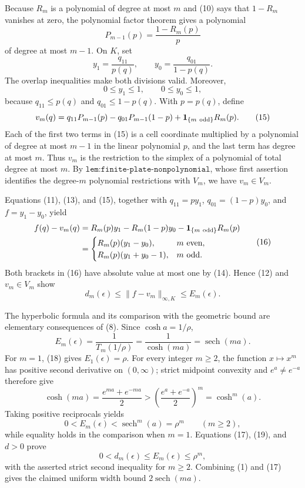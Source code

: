 Because \(R_m\) is a polynomial of degree at most \(m\) and (10) says that \(1-R_m\) vanishes at zero, the polynomial factor theorem gives a polynomial
\[
 P_{m-1}(p)=\frac{1-R_m(p)}{p} \tag{13}
\]
of degree at most \(m-1\).  On \(K\), set
\[
 y_1=\frac{q_{11}}{p(q)},
 \qquad
 y_0=\frac{q_{01}}{1-p(q)}.
\]
The overlap inequalities make both divisions valid.  Moreover,
\[
 0\leq y_1\leq1,
 \qquad
 0\leq y_0\leq1, \tag{14}
\]
because \(q_{11}\leq p(q)\) and \(q_{01}\leq1-p(q)\).  With \(p=p(q)\), define
\[
 v_m(q)=q_{11}P_{m-1}(p)-q_{01}P_{m-1}(1-p)
 +\mathbf 1_{\{m\ {\rm odd}\}}R_m(p). \tag{15}
\]
Each of the first two terms in (15) is a cell coordinate multiplied by a polynomial of degree at most \(m-1\) in the linear polynomial \(p\), and the last term has degree at most \(m\).  Thus \(v_m\) is the restriction to the simplex of a polynomial of total degree at most \(m\).  By \(\texttt{lem:finite-plate-nonpolynomial}\), whose first assertion identifies the degree-\(m\) polynomial restrictions with \(V_m\), we have \(v_m\in V_m\).

Equations (11), (13), and (15), together with \(q_{11}=py_1\), \(q_{01}=(1-p)y_0\), and \(f=y_1-y_0\), yield
\[
\begin{aligned}
 f(q)-v_m(q)
 &=R_m(p)y_1-R_m(1-p)y_0
   -\mathbf 1_{\{m\ {\rm odd}\}}R_m(p)\\
 &=
 \begin{cases}
 R_m(p)(y_1-y_0),&m\text{ even},\\
 R_m(p)(y_1+y_0-1),&m\text{ odd}.
 \end{cases}
\end{aligned} \tag{16}
\]
Both brackets in (16) have absolute value at most one by (14).  Hence (12) and \(v_m\in V_m\) show
\[
 d_m(\epsilon)
 \leq\lVert f-v_m\rVert_{\infty,K}
 \leq E_m(\epsilon). \tag{17}
\]

The hyperbolic formula and its comparison with the geometric bound are elementary consequences of (8).  Since \(\cosh a=1/\rho\),
\[
 E_m(\epsilon)=\frac{1}{T_m(1/\rho)}
 =\frac{1}{\cosh(ma)}=\operatorname{sech}(ma). \tag{18}
\]
For \(m=1\), (18) gives \(E_1(\epsilon)=\rho\).  For every integer \(m\geq2\), the function \(x\mapsto x^m\) has positive second derivative on \((0,\infty)\); strict midpoint convexity and \(e^a\ne e^{-a}\) therefore give
\[
 \cosh(ma)=\frac{e^{ma}+e^{-ma}}{2}
 >\left(\frac{e^a+e^{-a}}{2}\right)^m
 =\cosh^m(a).
\]
Taking positive reciprocals yields
\[
 0<E_m(\epsilon)<\operatorname{sech}^m(a)=\rho^m
 \qquad(m\geq2), \tag{19}
\]
while equality holds in the comparison when \(m=1\).  Equations (17), (19), and \(d>0\) prove
\[
 0<d_m(\epsilon)\leq E_m(\epsilon)\leq\rho^m,
\]
with the asserted strict second inequality for \(m\geq2\).  Combining (1) and (17) gives the claimed uniform width bound \(2\operatorname{sech}(ma)\).

